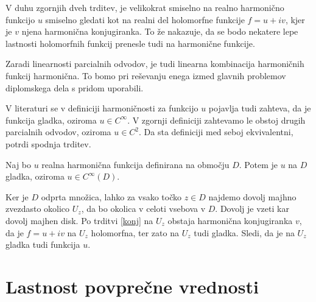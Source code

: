 \documentclass[mat1]{fmfdelo}
\begin{document}
    \begin{opomba}
        V duhu zgornjih dveh trditev, je velikokrat smiselno na realno harmonično funkcijo $u$ smiselno gledati kot na realni del holomorfne funkcije $f = u + iv$, kjer je $v$ njena harmonična konjugiranka. To že nakazuje, da se bodo nekatere lepe lastnosti holomorfnih funkcij prenesle tudi na harmonične funkcije.
    \end{opomba}
    \begin{opomba}
        \label{lin}
        Zaradi linearnosti parcialnih odvodov, je tudi linearna kombinacija harmoničnih funkcij harmonična. To bomo pri reševanju enega izmed glavnih problemov diplomskega dela s pridom uporabili.
    \end{opomba}
    \begin{opomba}
        V literaturi se v definiciji harmoničnosti za funkcijo $u$ pojavlja tudi zahteva, da je funkcija gladka, oziroma $u \in C^{\infty}$. V zgornji definiciji zahtevamo le obstoj drugih parcialnih odvodov, oziroma $u \in C^2$. 
        Da sta definiciji med seboj ekvivalentni, potrdi spodnja trditev. 
    \end{opomba}
    \begin{trditev}
        \label{gladkosth}
        Naj bo $u$ realna harmonična funkcija definirana na območju $D$. Potem je $u$ na $D$ gladka, oziroma $u \in C^{\infty}(D)$. 
    \end{trditev}
    \begin{dokaz}
        Ker je  $D$ odprta množica, lahko za vsako točko $z \in D$ najdemo dovolj majhno zvezdasto okolico $U_z$, da bo okolica v celoti vsebova v $D$. Dovolj je vzeti kar dovolj majhen disk. 
        Po trditvi \ref{konj} na $U_z$ obstaja harmonična konjugiranka $v$, da je $f = u+ iv$ na $U_z$ holomorfna, ter zato na $U_z$ tudi gladka. Sledi, da je na $U_z$ gladka tudi funkcija $u$.
    \end{dokaz}

\newpage
\section{Lastnost povprečne vrednosti}
\end{document}
